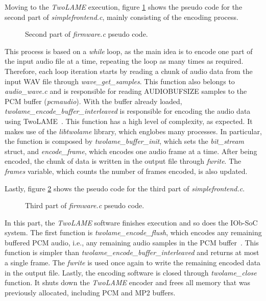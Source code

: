 Moving to the \textit{TwoLAME} execution, figure \ref{pseudo2} shows the pseudo code for the second part of \textit{simplefrontend.c}, mainly consisting of the encoding process.

\begin{figure}[H]
\centerline{}
\caption{Second part of \textit{firmware.c} pseudo code.}
\label{pseudo2}
\end{figure}


This process is based on a \textit{while} loop, as the main idea is to encode one part of the input audio file at a time, repeating the loop as many times as required. Therefore, each loop iteration starts by reading a chunk of audio data from the input WAV file through \textit{wave\_get\_samples}. This function also belongs to \textit{audio\_wave.c} and is responsible for reading AUDIOBUFSIZE samples to the PCM buffer (\textit{pcmaudio}). 
With the buffer already loaded, \textit{twolame\_encode\_buffer\_interleaved} is responsible for encoding the audio data using TwoLAME~\cite{bib:twolameapi}. This function has a high level of complexity, as expected. It makes use of the \textit{libtwolame} library, which englobes many processes. In particular, the function is composed by \textit{twolame\_buffer\_init}, which sets the \textit{bit\_stream} struct, and \textit{encode\_frame}, which encodes one audio frame at a time.
After being encoded, the chunk of data is written in the output file through \textit{fwrite}. The \textit{frames} variable, which counts the number of frames encoded, is also updated.  

Lastly, figure \ref{pseudo3} shows the pseudo code for the third part of \textit{simplefrontend.c}. 

\begin{figure}[H]
\centerline{}
\caption{Third part of \textit{firmware.c} pseudo code.}
\label{pseudo3}
\end{figure}


In this part, the \textit{TwoLAME} software finishes execution and so does the IOb-SoC system.
The first function is \textit{twolame\_encode\_flush}, which encodes any remaining buffered PCM audio, i.e., any remaining audio samples in the PCM buffer~\cite{bib:twolameapi}. This function is simpler than \textit{twolame\_encode\_buffer\_interleaved} and returns at most a single frame.
The \textit{fwrite} is used once again to write the remaining encoded data in the output file. Lastly, the encoding software is closed through \textit{twolame\_close} function. It shuts down the \textit{TwoLAME} encoder and frees all memory that was previously allocated, including PCM and MP2 buffers.

